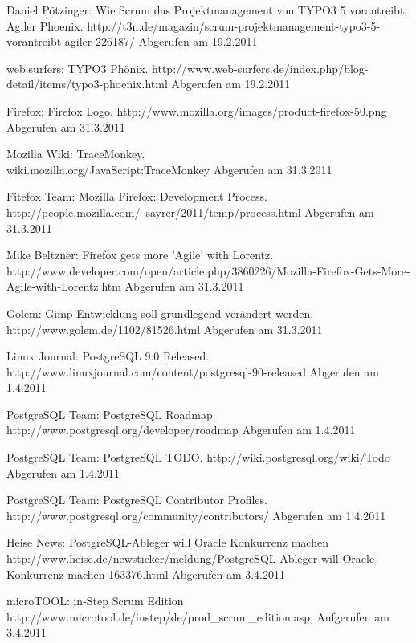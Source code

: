 \documentclass[german,english]{header}
\begin{document}
\begin{thebibliography}{5}
Daniel Pötzinger:
Wie Scrum das Projektmanagement von TYPO3 5 vorantreibt: Agiler Phoenix.
http://t3n.de/magazin/scrum-projektmanagement-typo3-5-vorantreibt-agiler-226187/ Abgerufen am 19.2.2011

web.surfers:
TYPO3 Phönix.
http://www.web-surfers.de/index.php/blog-detail/items/typo3-phoenix.html Abgerufen am 19.2.2011

Firefox:
Firefox Logo.
http://www.mozilla.org/images/product-firefox-50.png Abgerufen am 31.3.2011


Mozilla Wiki:
TraceMonkey.
\\wiki.mozilla.org/JavaScript:TraceMonkey Abgerufen am 31.3.2011

Fitefox Team:
Mozilla Firefox: Development Process.
http://people.mozilla.com/~sayrer/2011/temp/process.html Abgerufen am 31.3.2011

Mike Beltzner:
Firefox gets more 'Agile' with Lorentz.
\\http://www.developer.com/open/article.php/3860226/Mozilla-Firefox-Gets-More-Agile-with-Lorentz.htm Abgerufen am 31.3.2011

Golem: Gimp-Entwicklung soll grundlegend verändert werden.
http://www.golem.de/1102/81526.html Abgerufen am 31.3.2011

Linux Journal:
PostgreSQL 9.0 Released.
http://www.linuxjournal.com/content/postgresql-90-released Abgerufen am 1.4.2011

PostgreSQL Team:
PostgreSQL Roadmap.
http://www.postgresql.org/developer/roadmap Abgerufen am 1.4.2011

PostgreSQL Team:
PostgreSQL TODO.
http://wiki.postgresql.org/wiki/Todo Abgerufen am 1.4.2011

PostgreSQL Team:
PostgreSQL Contributor Profiles.
http://www.postgresql.org/community/contributors/ Abgerufen am 1.4.2011

Heise News:
PostgreSQL-Ableger will Oracle Konkurrenz machen
http://www.heise.de/newsticker/meldung/PostgreSQL-Ableger-will-Oracle-Konkurrenz-machen-163376.html Abgerufen am 3.4.2011

microTOOL:
in-Step Scrum Edition
http://www.microtool.de/instep/de/prod\_scrum\_edition.asp,
Aufgerufen am 3.4.2011


\end{thebibliography}
\end{document}
